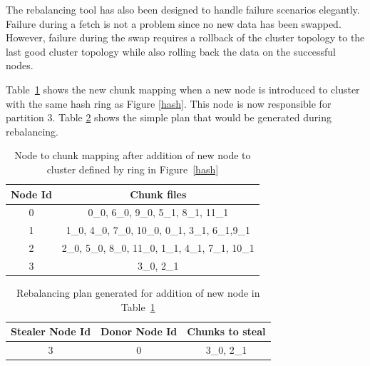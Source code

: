 The rebalancing tool has also been designed to handle failure
scenarios elegantly. Failure during a fetch is not a problem since no
new data has been swapped. However, failure during the swap requires a
rollback of the cluster topology to the last good cluster topology
while also rolling back the data on the successful nodes. 

Table~\ref{tab:new_node_to_chunk} shows the new chunk mapping when a
new node is introduced to cluster with the same hash ring as Figure
\ref{hash}. This node is now responsible for partition 3. Table 
\ref{tab:rebalance_plan} shows the simple plan that would be generated
during rebalancing.
 
\begin{table}
\begin{center}
    \begin{tabular}{ | c | c | }
    \hline
    Node Id & Chunk files \\ \hline
    0 &  	0\_0, 6\_0, 9\_0,      			5\_1, 8\_1, 11\_1 			\\
   	1 &   	1\_0, 4\_0, 7\_0, 10\_0,      	0\_1, 3\_1, 6\_1,9\_1  		\\
   	2 &    	2\_0, 5\_0, 8\_0, 11\_0,    	1\_1, 4\_1, 7\_1, 10\_1		\\
   	3 &   	3\_0,                         	2\_1 						\\
\hline
    \end{tabular}
\end{center}
 	\caption{Node to chunk mapping after addition of new node to cluster defined by ring in Figure~\ref{hash}}
 	\label{tab:new_node_to_chunk}
\end{table}

\begin{table}
\begin{center}
    \begin{tabular}{ | c | c | c | }
    \hline
    Stealer Node Id & Donor Node Id & Chunks to steal \\ \hline
    3 &  0 & 3\_0, 2\_1	\\
\hline
    \end{tabular}
\end{center}
\caption{Rebalancing plan generated for addition of new node in Table~\ref{tab:new_node_to_chunk}}
\label{tab:rebalance_plan}
\end{table}

